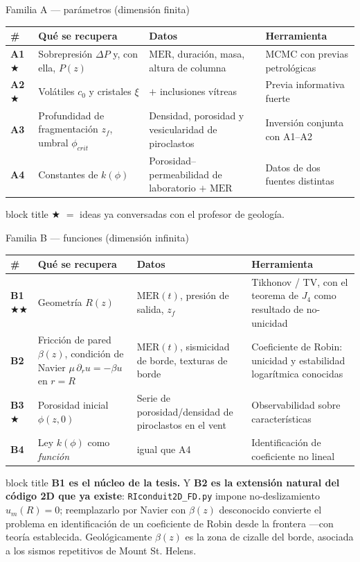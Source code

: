 \documentclass[aspectratio=169,10pt,t]{beamer}
\newcommand{\MER}{\mathrm{MER}}
\newcommand{\ideageo}{\textcolor{magma}{$\bigstar$}}
\newcommand{\mensaje}[1]{%
  \vfill
  \begin{beamercolorbox}[wd=\linewidth,sep=0.4em,rounded=true]{block title}
  \footnotesize #1
  \end{beamercolorbox}}
\begin{document}
\begin{frame}{Familia A — parámetros (dimensión finita)}
\small
\begin{tabular}{@{}p{}p{}p{}p{}@{}}
\toprule
\# & \textbf{Qué se recupera} & \textbf{Datos} & \textbf{Herramienta} \\
\midrule
\textbf{A1}\,\ideageo & Sobrepresión $\Delta P$ y, con ella, $P(z)$ &
$\MER$, duración, masa, altura de columna & MCMC con previas petrológicas \\[0.4em]
\textbf{A2}\,\ideageo & Volátiles $c_0$ y cristales $\xi$ &
$+$ inclusiones vítreas & Previa informativa fuerte \\[0.4em]
\textbf{A3} & Profundidad de fragmentación $z_f$, umbral $\phi_{crit}$ &
Densidad, porosidad y vesicularidad de piroclastos & Inversión conjunta con A1–A2 \\[0.4em]
\textbf{A4} & Constantes de $k(\phi)$ &
Porosidad–permeabilidad de laboratorio $+$ $\MER$ & Datos de dos fuentes distintas \\
\bottomrule
\end{tabular}

\mensaje{\ideageo{} $=$ ideas ya conversadas con el profesor de geología.}
\end{frame}

\begin{frame}{Familia B — funciones (dimensión infinita)}
\footnotesize
\begin{tabular}{@{}p{}p{}p{}p{}@{}}
\toprule
\# & \textbf{Qué se recupera} & \textbf{Datos} & \textbf{Herramienta} \\
\midrule
\textbf{B1}\,\ideageo\ideageo & \alert{Geometría $R(z)$} &
$\MER(t)$, presión de salida, $z_f$ & Tikhonov / TV, con el teorema de $J_4$
como resultado de no-unicidad \\[0.4em]
\textbf{B2} & Fricción de pared $\beta(z)$, condición de Navier
$\mu\,\partial_r u=-\beta u$ en $r=R$ &
$\MER(t)$, sismicidad de borde, texturas de borde &
Coeficiente de Robin: unicidad y estabilidad logarítmica conocidas \\[0.4em]
\textbf{B3}\,\ideageo & Porosidad inicial $\phi(z,0)$ &
Serie de porosidad/densidad de piroclastos en el vent &
Observabilidad sobre características \\[0.4em]
\textbf{B4} & Ley $k(\phi)$ como \emph{función} & igual que A4 &
Identificación de coeficiente no lineal \\
\bottomrule
\end{tabular}

\mensaje{\textbf{B1 es el núcleo de la tesis.} Y \textbf{B2 es la extensión
natural del código 2D que ya existe}: \texttt{RIconduit2D\_FD.py} impone
no-deslizamiento $u_m(R)=0$; reemplazarlo por Navier con $\beta(z)$ desconocido
convierte el problema en identificación de un coeficiente de Robin desde la
frontera —con teoría establecida. Geológicamente $\beta(z)$ es la zona de
cizalle del borde, asociada a los sismos repetitivos de Mount St. Helens.}
\end{frame}
\end{document}
